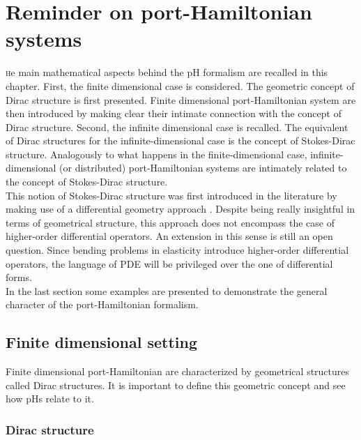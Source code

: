 \chapter{Reminder on port-Hamiltonian systems}

\minitoc

\lettrine{\color{theme}{T}}he main mathematical aspects behind the pH formalism are recalled in this chapter. First, the finite dimensional case is considered. The geometric concept of Dirac structure \cite{courant1990} is first presented. Finite dimensional port-Hamiltonian system are then introduced by making clear their intimate connection with the concept of Dirac structure. Second, the infinite dimensional case is recalled. The equivalent of Dirac structures for the infinite-dimensional case is the concept of Stokes-Dirac structure. Analogously to what happens in the finite-dimensional case, infinite-dimensional (or distributed) port-Hamiltonian systems are intimately related to the concept of Stokes-Dirac structure. \\

This notion of Stokes-Dirac structure was first introduced in the literature by making use of a differential geometry approach \cite{vanderschaft2002}. Despite being really insightful in terms of geometrical structure, this approach does not encompass the case of higher-order differential operators. An extension in this sense is still an open question. Since bending problems in elasticity introduce higher-order differential operators, the language of PDE will be privileged over the one of differential forms. \\

In the last section some examples are presented to demonstrate the general character of the port-Hamiltonian formalism. 

 
\section{Finite dimensional setting}

Finite dimensional port-Hamiltonian are characterized by geometrical structures called Dirac structures. It is important to define this geometric concept and see how pHs relate to it. \\

\subsection{Dirac structure}

